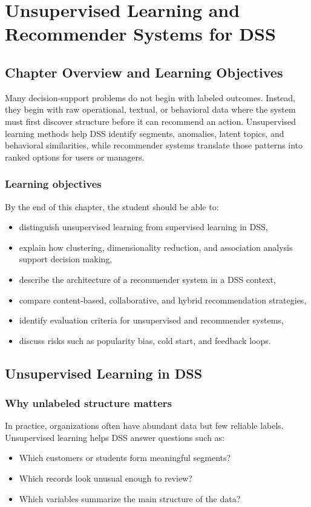 \chapter{Unsupervised Learning and Recommender Systems for DSS}
\label{ch:unsupervised-learning-and-recommender-systems-for-dss}

\section{Chapter Overview and Learning Objectives}

Many decision-support problems do not begin with labeled outcomes. Instead,
they begin with raw operational, textual, or behavioral data where the system
must first discover structure before it can recommend an action. Unsupervised
learning methods help DSS identify segments, anomalies, latent topics, and
behavioral similarities, while recommender systems translate those patterns
into ranked options for users or managers.

\subsection*{Learning objectives}
By the end of this chapter, the student should be able to:
\begin{itemize}
  \item distinguish unsupervised learning from supervised learning in DSS,
  \item explain how clustering, dimensionality reduction, and association
  analysis support decision making,
  \item describe the architecture of a recommender system in a DSS context,
  \item compare content-based, collaborative, and hybrid recommendation
  strategies,
  \item identify evaluation criteria for unsupervised and recommender systems,
  \item discuss risks such as popularity bias, cold start, and feedback loops.
\end{itemize}

\section{Unsupervised Learning in DSS}

\subsection{Why unlabeled structure matters}
In practice, organizations often have abundant data but few reliable labels.
Unsupervised learning helps DSS answer questions such as:
\begin{itemize}
  \item Which customers or students form meaningful segments?
  \item Which records look unusual enough to review?
  \item Which variables summarize the main structure of the data?
\end{itemize}

